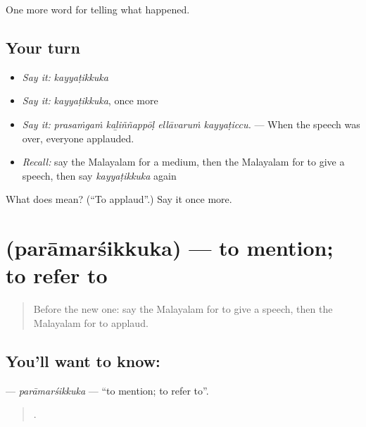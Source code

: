 \begin{grammarlens}[title={What you've built}]
One more word for telling what happened.
\end{grammarlens}

\subsection*{Your turn}
\begin{itemize}
\raggedright
  \item \emph{Say it:} \emph{kayyaṭikkuka}
  \item \emph{Say it:} \emph{kayyaṭikkuka}, once more
  \item \emph{Say it:} \emph{prasaṁgaṁ kaḻiññappōḷ ellāvaruṁ kayyaṭiccu.} — When the speech was over, everyone applauded.
  \item \emph{Recall:} say the Malayalam for a medium, then the Malayalam for to give a speech, then say \emph{kayyaṭikkuka} again
\end{itemize}

\begin{tcolorbox}[breakable,colback=teal!4,colframe=teal!35!black,title={Before you move on}]
What does  mean? (\textquotedblleft{}To applaud\textquotedblright{}.) Say it once more.
\end{tcolorbox}
\section[\texorpdfstring{\ml{പരാമർശിക്കുക} (parāmarśikkuka)}{പരാമർശിക്കുക (parāmarśikkuka)}]{ (parāmarśikkuka) — to mention; to refer to}

\label{lesson:ML-C354-paramarsikkuka}



\begin{quote}
Before the new one: say the Malayalam for to give a speech, then the Malayalam for to applaud.
\end{quote}

\subsection*{You'll want to know: }
\textbf{} — \emph{parāmarśikkuka} — \textquotedblleft{}to mention; to refer to\textquotedblright{}.

\begin{quote}
   .
\end{quote}

